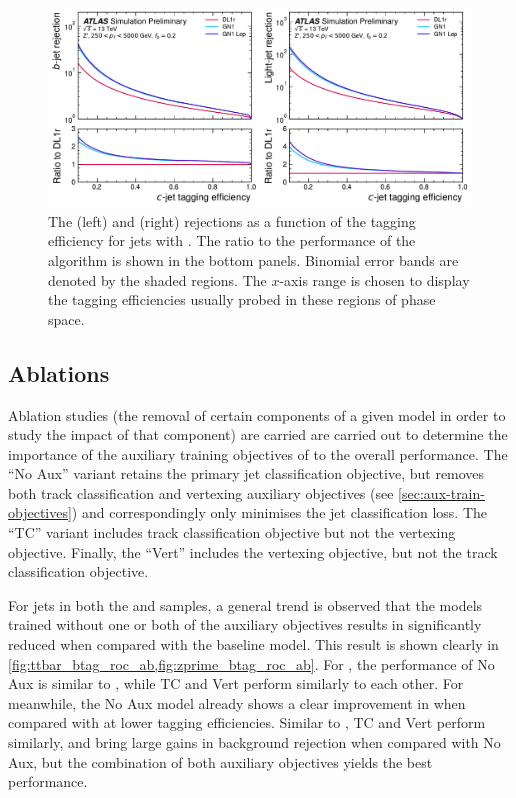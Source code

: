 \begin{figure}[!p]
   \centering
   \includegraphics[width=\textwidth]{chapters/gnn_tagger/figs/results/main/zprime/zprime_roc_ctag.pdf}
   \caption{
        The \bjet (left) and \ljet (right) rejections as a function of the \cjet tagging efficiency for \Zprime jets with \Zprimept \cite{ATL-PHYS-PUB-2022-027}.
        The ratio to the performance of the \DLr algorithm is shown in the bottom panels.
        Binomial error bands are denoted by the shaded regions.
        The $x$-axis range is chosen to display the \cjet tagging efficiencies usually probed in these regions of phase space.
    }
   \label{fig:zprime_ctag_roc}
\end{figure}




\subsection{Ablations}\label{sec:gnn_ablations}

Ablation studies (the removal of certain components of a given model in order to study the impact of that component) are carried are carried out to determine the importance of the auxiliary training objectives of \GNN to the overall performance.
The ``\GNN No Aux'' variant retains the primary jet classification objective, but removes both track classification and vertexing auxiliary objectives (see \cref{sec:aux-train-objectives}) and correspondingly only minimises the jet classification loss.
The ``\GNN TC'' variant includes track classification objective but not the vertexing objective.
Finally, the ``\GNN Vert'' includes the vertexing objective, but not the track classification objective.

For jets in both the \ttbar and \Zprime samples, a general trend is observed that the models trained without one or both of the auxiliary objectives results in significantly reduced \clrej when compared with the baseline \GNN model.
This result is shown clearly in \cref{fig:ttbar_btag_roc_ab,fig:zprime_btag_roc_ab}.
For \ttbarjets, the performance of \GNN No Aux is similar to \DLr, while \GNN TC and \GNN Vert perform similarly to each other.
For \Zprimejets meanwhile, the \GNN No Aux model already shows a clear improvement in \clrej when compared with \DLr at lower \bjet tagging efficiencies.
Similar to \ttbarjets, \GNN TC and \GNN Vert perform similarly, and bring large gains in background rejection when compared with \GNN No Aux, but the combination of both auxiliary objectives yields the best performance.

